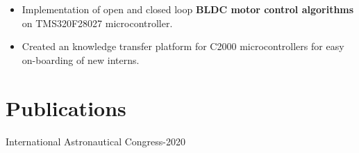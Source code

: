\documentclass{resume}
\begin{document}
\vspace{-0.8cm}
\vspace{-0.2cm}
\begin{itemize}\setlength{\itemsep}{0pt}\setlength{\parskip}{0pt}\vspace{0.1cm}
    \item Implementation of open and closed loop \textbf{BLDC motor control algorithms} on TMS320F28027 microcontroller.
    \item Created an knowledge transfer platform for C2000 microcontrollers for easy on-boarding of new interns.
\end{itemize}
\section{Publications}
 { International Astronautical Congress-2020}
\end{document}

